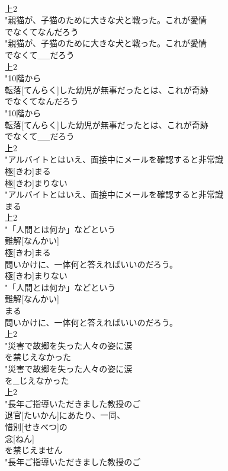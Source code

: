 \documentclass[8pt]{extreport}
\begin{document}
\begin{CJK}{UTF8}{min}
\\	上2
\\	"親猫が、子猫のために大きな犬と戦った。これが愛情
\\	でなくてなんだろう
\\	"親猫が、子猫のために大きな犬と戦った。これが愛情
\\	でなくて__だろう
\\	上2
\\	"10階から
\\	転落[てんらく]した幼児が無事だったとは、これが奇跡
\\	でなくてなんだろう
\\	"10階から
\\	転落[てんらく]した幼児が無事だったとは、これが奇跡
\\	でなくて__だろう
\\	上2
\\	"アルバイトとはいえ、面接中にメールを確認すると非常識
\\	極[きわ]まる
\\	極[きわ]まりない
\\	"アルバイトとはいえ、面接中にメールを確認すると非常識
\\	まる
\\	上2
\\	"「人間とは何か」などという
\\	難解[なんかい]
\\	極[きわ]まる
\\	問いかけに、一体何と答えればいいのだろう。
\\	極[きわ]まりない
\\	"「人間とは何か」などという
\\	難解[なんかい]
\\	まる
\\	問いかけに、一体何と答えればいいのだろう。
\\	上2
\\	"災害で故郷を失った人々の姿に涙
\\	を禁じえなかった
\\	"災害で故郷を失った人々の姿に涙
\\	を_じえなかった
\\	上2
\\	"長年ご指導いただきました教授のご
\\	退官[たいかん]にあたり、一同、
\\	惜別[せきべつ]の
\\	念[ねん]
\\	を禁じえません
\\	"長年ご指導いただきました教授のご

\end{CJK}
\end{document}
